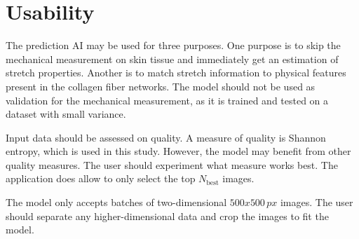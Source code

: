 \section{Usability}
The prediction AI may be used for three purposes.
One purpose is to skip the mechanical measurement on skin tissue and immediately get an estimation of stretch properties.
Another is to match stretch information to physical features present in the collagen fiber networks.
The model should not be used as validation for the mechanical measurement, as it is trained and tested on a dataset with small variance.

Input data should be assessed on quality.
A measure of quality is Shannon entropy, which is used in this study.
However, the model may benefit from other quality measures.
The user should experiment what measure works best.
The application does allow to only select the top $N_\mathrm{best}$ images.

The model only accepts batches of two-dimensional $500x500\,\unit{px}$ images.
The user should separate any higher-dimensional data and crop the images to fit the model.

